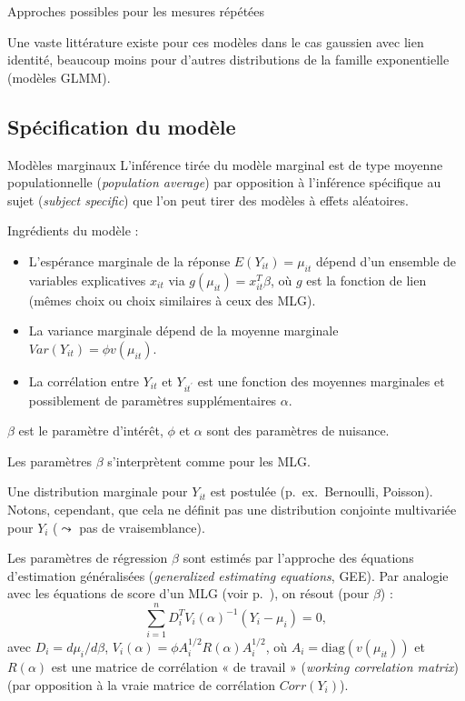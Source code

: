 \documentclass{BeamerTemplate}
\begin{document}
\begin{refsection}
\begin{frame}{Approches possibles pour les mesures répétées}
\begin{itemize}
Une vaste littérature existe pour ces modèles dans le cas gaussien avec lien identité,
beaucoup moins pour d'autres distributions de la famille exponentielle (modèles GLMM).
\end{itemize}

\end{frame}

\subsection{Spécification du modèle}
\begin{frame}[allowframebreaks]{Modèles marginaux}
L'inférence tirée du modèle marginal est de type {\color{blue}moyenne populationnelle} (\textit{population average}) par opposition à l'inférence {\color{blue}spécifique au sujet} (\textit{subject specific}) que l'on peut tirer des modèles à effets aléatoires.

\bigskip
Ingrédients du modèle :
\begin{itemize}
\item L'espérance marginale de la réponse $E(Y_{it}) = \mu_{it}$
  dépend d'un ensemble de variables explicatives $x_{it}$ via $g(\mu_{it})
  = x_{it}^T \beta$, où $g$ est la fonction de lien (mêmes choix ou choix similaires à ceux des MLG).
\item La variance marginale dépend de la moyenne marginale $Var(Y_{it})
  = \phi v(\mu_{it}) $.
\item La corrélation entre $Y_{it}$ et $Y_{it^\prime}$ est une fonction des
  moyennes marginales et possiblement de paramètres supplémentaires $\alpha$.
\end{itemize}

\bigskip
$\beta$ est le paramètre d'intérêt, $\phi$ et $\alpha$ sont des paramètres de nuisance.

\bigskip
Les paramètres $\beta$ s'interprètent comme pour les MLG.

\bigskip
Une distribution marginale pour $Y_{it}$ est postulée (p.~ex.\ Bernoulli, Poisson). Notons,
cependant, que cela ne définit pas une distribution conjointe multivariée pour $Y_i$
($\leadsto$ pas de vraisemblance).

\bigskip\bigskip\bigskip\bigskip\bigskip\bigskip\bigskip
Les paramètres de régression $\beta$ sont estimés par l'approche des
{\color{blue}équations d'estimation généralisées} (\textit{generalized estimating equations}, GEE).
Par analogie avec les équations de score d'un MLG (voir
p.~\pageref{EE.GLM}), on résout (pour $\beta$) :
$$\sum_{i=1}^n D_i^T V_i(\alpha)^{-1} (Y_i - \mu_i) =0,$$
avec $D_i = d \mu_i/ d \beta$, $V_i(\alpha) = \phi  A_i^{1/2} R(\alpha)
A_i^{1/2}$, où $A_i = \mbox{diag}(v(\mu_{it}))$ et
$R(\alpha)$ est une matrice de {\color{blue}corrélation « de travail »} (\textit{working correlation matrix}) (par
opposition à la vraie matrice de corrélation $Corr(Y_i)$).


\end{frame}
\end{refsection}
\end{document}
